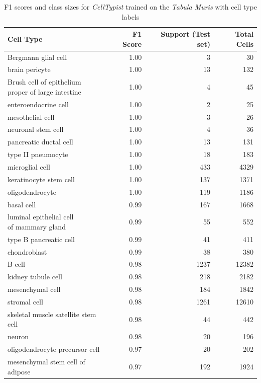 \begin{table}[pht!]
\small
\caption[F1 scores and class sizes for \textit{CellTypist} trained on the \textit{Tabula Muris} with cell type labels]{F1 scores and class sizes for \textit{CellTypist} trained on the \textit{Tabula Muris} with cell type labels}
\centering
\label{table:tab_tmmodelcells}

\begin{tabular}{lrrr}
  \toprule
Cell Type & F1 Score & Support (Test set) & Total Cells \\ 
  \midrule
Bergmann glial cell & 1.00 &   3 &  30 \\ 
  brain pericyte & 1.00 &  13 & 132 \\ 
  \specialcell[t]{Brush cell of epithelium\\proper of large intestine} & 1.00 &   4 &  45 \\ 
  enteroendocrine cell & 1.00 &   2 &  25 \\ 
  mesothelial cell & 1.00 &   3 &  26 \\ 
  neuronal stem cell & 1.00 &   4 &  36 \\ 
  pancreatic ductal cell & 1.00 &  13 & 131 \\ 
  type II pneumocyte & 1.00 &  18 & 183 \\ 
  microglial cell & 1.00 & 433 & 4329 \\ 
  keratinocyte stem cell & 1.00 & 137 & 1371 \\ 
  oligodendrocyte & 1.00 & 119 & 1186 \\ 
  basal cell & 0.99 & 167 & 1668 \\ 
  \specialcell[t]{luminal epithelial cell\\of mammary gland} & 0.99 &  55 & 552 \\ 
  type B pancreatic cell & 0.99 &  41 & 411 \\ 
  chondroblast & 0.99 &  38 & 380 \\ 
  B cell & 0.98 & 1237 & 12382 \\ 
  kidney tubule cell & 0.98 & 218 & 2182 \\ 
  mesenchymal cell & 0.98 & 184 & 1842 \\ 
  stromal cell & 0.98 & 1261 & 12610 \\ 
  skeletal muscle satellite stem cell & 0.98 &  44 & 442 \\ 
  neuron & 0.98 &  20 & 196 \\ 
  oligodendrocyte precursor cell & 0.97 &  20 & 202 \\ 
  mesenchymal stem cell of adipose & 0.97 & 192 & 1924 \\ 

\end{tabular}
\end{table}
